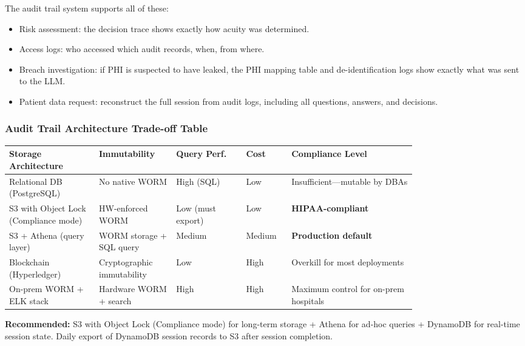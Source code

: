 The audit trail system supports all of these:
\begin{itemize}
  \item Risk assessment: the decision trace shows exactly how acuity was determined.
  \item Access logs: who accessed which audit records, when, from where.
  \item Breach investigation: if PHI is suspected to have leaked, the PHI mapping table and de-identification logs show exactly what was sent to the LLM.
  \item Patient data request: reconstruct the full session from audit logs, including all questions, answers, and decisions.
\end{itemize}

\subsubsection*{Audit Trail Architecture Trade-off Table}

\begin{tabular}{|p{0.18\linewidth}|p{0.14\linewidth}|p{0.14\linewidth}|p{0.07\linewidth}|p{0.25\linewidth}|}
\hline
\textbf{Storage Architecture} & \textbf{Immutability} & \textbf{Query Perf.} & \textbf{Cost} & \textbf{Compliance Level} \\
\hline
Relational DB (PostgreSQL) & No native WORM & High (SQL) & Low & Insufficient---mutable by DBAs \\
\hline
S3 with Object Lock (Compliance mode) & HW-enforced WORM & Low (must export) & Low & \textbf{HIPAA-compliant} \\
\hline
S3 + Athena (query layer) & WORM storage + SQL query & Medium & Medium & \textbf{Production default} \\
\hline
Blockchain (Hyperledger) & Cryptographic immutability & Low & High & Overkill for most deployments \\
\hline
On-prem WORM + ELK stack & Hardware WORM + search & High & High & Maximum control for on-prem hospitals \\
\hline
\end{tabular}

\bigskip
\textbf{Recommended:} S3 with Object Lock (Compliance mode) for long-term storage + Athena for ad-hoc queries + DynamoDB for real-time session state. Daily export of DynamoDB session records to S3 after session completion.

